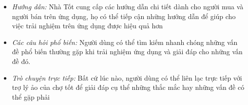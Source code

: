 \begin{itemize}
    \begin{itemize}
        \item \textit{Hướng dẫn:} Nhà Tốt cung cấp các hướng dẫn chi tiết dành cho người mua và người bán trên ứng dụng, họ có thể tiếp cận những hướng dẫn để giúp cho việc trải nghiệm trên ứng dụng được hiệu quả hơn
        \item \textit{Các câu hỏi phổ biến:} Người dùng có thể tìm kiếm nhanh chóng những vấn đề phổ biến thường gặp khi trải nghiệm ứng dụng và giải đáp cho những vấn đề đó.
        \item \textit{Trò chuyện trực tiếp:} Bất cứ lúc nào, người dùng có thể liên lạc trực tiếp với trợ lý ảo của chợ tốt để giải đáp cụ thể những thắc mắc hay những vấn đề có thể gặp phải
    \end{itemize}
\end{itemize}
